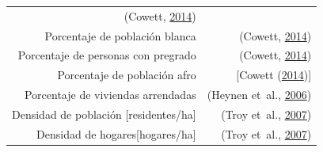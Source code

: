\documentclass[12pt,a4paper,openany]{book}
\theoremstyle{definition}
\theoremstyle{definition}
\theoremstyle{definition}
\theoremstyle{remark}
\begin{document}
\begin{longtable}[]{@{}rr@{}}
\begin{minipage}[t]{0.31\columnwidth}
(Cowett, \protect\hyperlink{ref-cowett_methodology_2014}{2014})\strut
\end{minipage}\tabularnewline
\begin{minipage}[t]{0.57\columnwidth}\raggedleft\strut
Porcentaje de población blanca\strut
\end{minipage} & \begin{minipage}[t]{0.31\columnwidth}\raggedleft\strut
(Cowett, \protect\hyperlink{ref-cowett_methodology_2014}{2014})\strut
\end{minipage}\tabularnewline
\begin{minipage}[t]{0.57\columnwidth}\raggedleft\strut
Porcentaje de personas con pregrado\strut
\end{minipage} & \begin{minipage}[t]{0.31\columnwidth}\raggedleft\strut
(Cowett, \protect\hyperlink{ref-cowett_methodology_2014}{2014})\strut
\end{minipage}\tabularnewline
\begin{minipage}[t]{0.57\columnwidth}\raggedleft\strut
Porcentaje de población afro\strut
\end{minipage} & \begin{minipage}[t]{0.31\columnwidth}\raggedleft\strut
{[}Cowett
(\protect\hyperlink{ref-cowett_methodology_2014}{2014}){]}\strut
\end{minipage}\tabularnewline
\begin{minipage}[t]{0.57\columnwidth}\raggedleft\strut
Porcentaje de viviendas arrendadas\strut
\end{minipage} & \begin{minipage}[t]{0.31\columnwidth}\raggedleft\strut
(Heynen et~al.,
\protect\hyperlink{ref-heynen_political_2006}{2006})\strut
\end{minipage}\tabularnewline
\begin{minipage}[t]{0.57\columnwidth}\raggedleft\strut
Densidad de población {[}residentes/ha{]}\strut
\end{minipage} & \begin{minipage}[t]{0.31\columnwidth}\raggedleft\strut
(Troy et~al., \protect\hyperlink{ref-troy_predicting_2007}{2007})\strut
\end{minipage}\tabularnewline
\begin{minipage}[t]{0.57\columnwidth}\raggedleft\strut
Densidad de hogares{[}hogares/ha{]}\strut
\end{minipage} & \begin{minipage}[t]{0.31\columnwidth}\raggedleft\strut
(Troy et~al., \protect\hyperlink{ref-troy_predicting_2007}{2007})\strut

\end{minipage}
\end{longtable}
\end{document}
